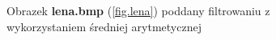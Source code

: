 \documentclass{classrep}
\begin{document}
\begin{figure}
{{  \label{fig.lena_average_5x5}
 }
}
\caption{Obrazek \textbf{lena.bmp} (\ref{fig.lena}) poddany filtrowaniu z wykorzystaniem średniej arytmetycznej}
\label{fig.lena_average}
\end{figure}

\end{document}
